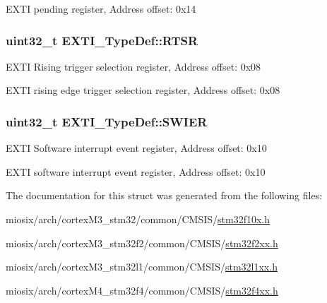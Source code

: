 E\-X\-T\-I pending register, Address offset\-: 0x14 \hypertarget{struct_e_x_t_i___type_def_ac019d211d8c880b327a1b90a06cc0675}{
\subsubsection[{R\-T\-S\-R}]{ uint32\-\_\-t E\-X\-T\-I\-\_\-\-Type\-Def\-::\-R\-T\-S\-R}}\label{struct_e_x_t_i___type_def_ac019d211d8c880b327a1b90a06cc0675}
E\-X\-T\-I Rising trigger selection register, Address offset\-: 0x08

E\-X\-T\-I rising edge trigger selection register, Address offset\-: 0x08 \hypertarget{struct_e_x_t_i___type_def_a5c1f538e64ee90918cd158b808f5d4de}{
\subsubsection[{S\-W\-I\-E\-R}]{ uint32\-\_\-t E\-X\-T\-I\-\_\-\-Type\-Def\-::\-S\-W\-I\-E\-R}}\label{struct_e_x_t_i___type_def_a5c1f538e64ee90918cd158b808f5d4de}
E\-X\-T\-I Software interrupt event register, Address offset\-: 0x10

E\-X\-T\-I software interrupt event register, Address offset\-: 0x10 

The documentation for this struct was generated from the following files\-:\begin{DoxyCompactItemize}
\item 
miosix/arch/cortex\-M3\-\_\-stm32/common/\-C\-M\-S\-I\-S/\hyperlink{stm32f10x_8h}{stm32f10x.\-h}\item 
miosix/arch/cortex\-M3\-\_\-stm32f2/common/\-C\-M\-S\-I\-S/\hyperlink{stm32f2xx_8h}{stm32f2xx.\-h}\item 
miosix/arch/cortex\-M3\-\_\-stm32l1/common/\-C\-M\-S\-I\-S/\hyperlink{stm32l1xx_8h}{stm32l1xx.\-h}\item 
miosix/arch/cortex\-M4\-\_\-stm32f4/common/\-C\-M\-S\-I\-S/\hyperlink{stm32f4xx_8h}{stm32f4xx.\-h}\end{DoxyCompactItemize}
